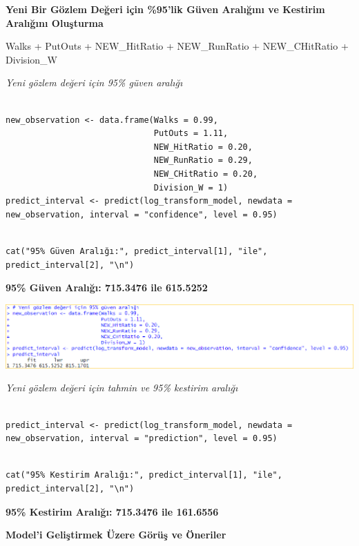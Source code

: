 \documentclass[
]{article}
\begin{document}
\textbf{Yeni Bir Gözlem Değeri için \%95'lik Güven Aralığını ve Kestirim
Aralığını Oluşturma}

Walks + PutOuts + NEW\_HitRatio + NEW\_RunRatio + NEW\_CHitRatio +
Division\_W

\emph{Yeni gözlem değeri için 95\% güven aralığı}

\begin{verbatim}

new_observation <- data.frame(Walks = 0.99, 
                              PutOuts = 1.11, 
                              NEW_HitRatio = 0.20, 
                              NEW_RunRatio = 0.29, 
                              NEW_CHitRatio = 0.20, 
                              Division_W = 1)
predict_interval <- predict(log_transform_model, newdata = new_observation, interval = "confidence", level = 0.95)
\end{verbatim}

\begin{verbatim}

cat("95% Güven Aralığı:", predict_interval[1], "ile", predict_interval[2], "\n")
\end{verbatim}

\textbf{95\% Güven Aralığı: 715.3476 ile 615.5252}

\includegraphics{Picture15.png}

\emph{Yeni gözlem değeri için tahmin ve 95\% kestirim aralığı}

\begin{verbatim}

predict_interval <- predict(log_transform_model, newdata = new_observation, interval = "prediction", level = 0.95)
\end{verbatim}

\begin{verbatim}

cat("95% Kestirim Aralığı:", predict_interval[1], "ile", predict_interval[2], "\n")
\end{verbatim}

\textbf{95\% Kestirim Aralığı: 715.3476 ile 161.6556}

\textbf{Model'i Geliştirmek Üzere Görüş ve Öneriler}
\end{document}
